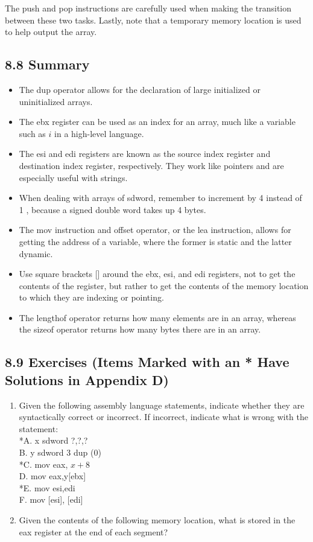 \documentclass[10pt]{book}
\begin{document}
The push and pop instructions are carefully used when making the transition between these two tasks. Lastly, note that a temporary memory location is used to help output the array.

\subsection*{8.8 Summary}
\begin{itemize}
  \item The dup operator allows for the declaration of large initialized or uninitialized arrays.
  \item The ebx register can be used as an index for an array, much like a variable such as $i$ in a high-level language.
  \item The esi and edi registers are known as the source index register and destination index register, respectively. They work like pointers and are especially useful with strings.
  \item When dealing with arrays of sdword, remember to increment by 4 instead of 1 , because a signed double word takes up 4 bytes.
  \item The mov instruction and offset operator, or the lea instruction, allows for getting the address of a variable, where the former is static and the latter dynamic.
  \item Use square brackets [] around the ebx, esi, and edi registers, not to get the contents of the register, but rather to get the contents of the memory location to which they are indexing or pointing.
  \item The lengthof operator returns how many elements are in an array, whereas the sizeof operator returns how many bytes there are in an array.
\end{itemize}

\subsection*{8.9 Exercises (Items Marked with an * Have Solutions in Appendix D)}
\begin{enumerate}
  \item Given the following assembly language statements, indicate whether they are syntactically correct or incorrect. If incorrect, indicate what is wrong with the statement:\\
*A. x sdword ?,?,?\\
B. y sdword 3 dup (0)\\
*C. mov eax, $x+8$\\[0pt]
D. mov eax,y[ebx]\\
*E. mov esi,edi\\[0pt]
F. mov [esi], [edi]
  \item Given the contents of the following memory location, what is stored in the eax register at the end of each segment?
\end{enumerate}
\end{document}
